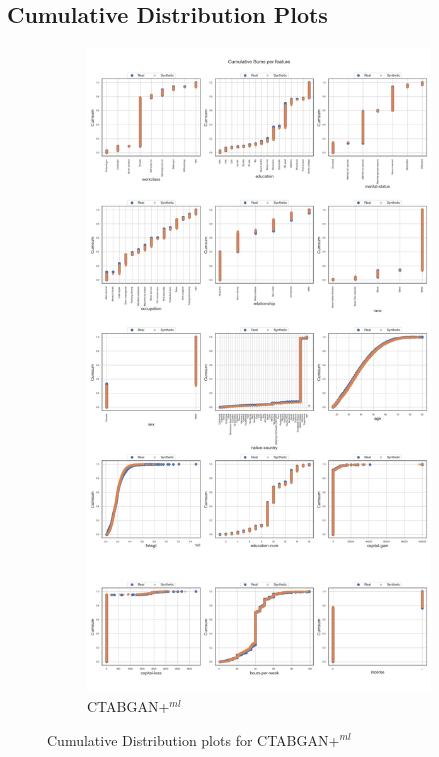 
\newpage
\subsection[]{Cumulative Distribution Plots}
\label{A:cumsum}
\begin{figure}[h]
	\centering
	\begin{subfigure}{0.6\textwidth}
		\includegraphics[width=\linewidth]{images/cumsums/ctabgan+.jpg}
		\caption{CTABGAN+$^{ml}$}
	\end{subfigure}
	\caption[Cumulative Distribution plots CTABGAN+ Model]{Cumulative Distribution plots for CTABGAN+$^{ml}$}
	\label{fig_a:cumsum_0}
\end{figure}


